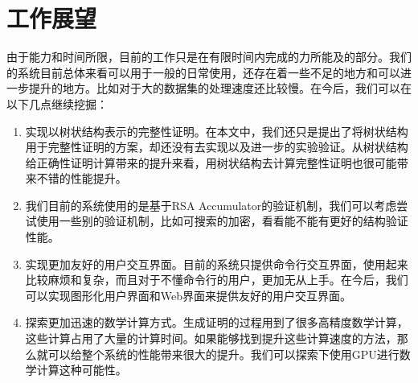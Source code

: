 \section{工作展望}
由于能力和时间所限，目前的工作只是在有限时间内完成的力所能及的部分。我们的系统目前总体来看可以用于一般的日常使用，还存在着一些不足的地方和可以进一步提升的地方。比如对于大的数据集的处理速度还比较慢。在今后，我们可以在以下几点继续挖掘：
\begin{enumerate}
\item 实现以树状结构表示的完整性证明。在本文中，我们还只是提出了将树状结构用于完整性证明的方案，却还没有去实现以及进一步的实验验证。从树状结构给正确性证明计算带来的提升来看，用树状结构去计算完整性证明也很可能带来不错的性能提升。
\item 我们目前的系统使用的是基于RSA Accumulator的验证机制，我们可以考虑尝试使用一些别的验证机制，比如可搜索的加密，看看能不能有更好的结构验证性能。
\item 实现更加友好的用户交互界面。目前的系统只提供命令行交互界面，使用起来比较麻烦和复杂，而且对于不懂命令行的用户，更加无从上手。在今后，我们可以实现图形化用户界面和Web界面来提供友好的用户交互界面。
\item 探索更加迅速的数学计算方式。生成证明的过程用到了很多高精度数学计算，这些计算占用了大量的计算时间。如果能够找到提升这些计算速度的方法，那么就可以给整个系统的性能带来很大的提升。我们可以探索下使用GPU进行数学计算这种可能性。
\end{enumerate}

